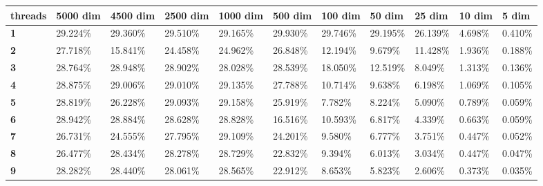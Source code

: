 \begin{table}[ht]
\centering
\begin{tabular}{|l|l|l|l|l|l|l|l|l|l|l|}
\hline
\textbf{threads} & \textbf{5000 dim} & \textbf{4500 dim} & \textbf{2500 dim} & \textbf{1000 dim} & \textbf{500 dim} & \textbf{100 dim} & \textbf{50 dim} & \textbf{25 dim} & \textbf{10 dim} & \textbf{5 dim} \\ \hline
\textbf{1}       & 29.224\%          & 29.360\%          & 29.510\%          & 29.165\%          & 29.930\%         & 29.746\%         & 29.195\%        & 26.139\%        & 4.698\%         & 0.410\%        \\ \hline
\textbf{2}       & 27.718\%          & 15.841\%          & 24.458\%          & 24.962\%          & 26.848\%         & 12.194\%         & 9.679\%         & 11.428\%        & 1.936\%         & 0.188\%        \\ \hline
\textbf{3}       & 28.764\%          & 28.948\%          & 28.902\%          & 28.028\%          & 28.539\%         & 18.050\%         & 12.519\%        & 8.049\%         & 1.313\%         & 0.136\%        \\ \hline
\textbf{4}       & 28.875\%          & 29.006\%          & 29.010\%          & 29.135\%          & 27.788\%         & 10.714\%         & 9.638\%         & 6.198\%         & 1.069\%         & 0.105\%        \\ \hline
\textbf{5}       & 28.819\%          & 26.228\%          & 29.093\%          & 29.158\%          & 25.919\%         & 7.782\%          & 8.224\%         & 5.090\%         & 0.789\%         & 0.059\%        \\ \hline
\textbf{6}       & 28.942\%          & 28.884\%          & 28.628\%          & 28.828\%          & 16.516\%         & 10.593\%         & 6.817\%         & 4.339\%         & 0.663\%         & 0.059\%        \\ \hline
\textbf{7}       & 26.731\%          & 24.555\%          & 27.795\%          & 29.109\%          & 24.201\%         & 9.580\%          & 6.777\%         & 3.751\%         & 0.447\%         & 0.052\%        \\ \hline
\textbf{8}       & 26.477\%          & 28.434\%          & 28.278\%          & 28.729\%          & 22.832\%         & 9.394\%          & 6.013\%         & 3.034\%         & 0.447\%         & 0.047\%        \\ \hline
\textbf{9}       & 28.282\%          & 28.440\%          & 28.061\%          & 28.565\%          & 22.912\%         & 8.653\%          & 5.823\%         & 2.606\%         & 0.373\%         & 0.035\%        \\ \hline

\end{tabular}
\end{table}
